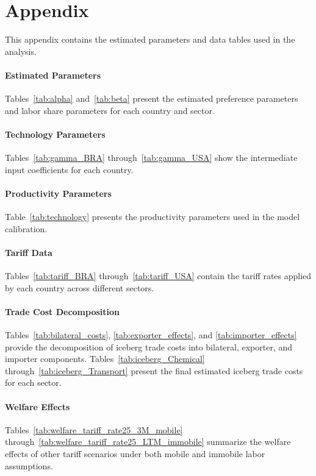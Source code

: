 \section*{Appendix}

This appendix contains the estimated parameters and data tables used in the analysis.

\paragraph{Estimated Parameters}
Tables~\ref{tab:alpha} and~\ref{tab:beta} present the estimated preference parameters and labor share parameters for each country and sector.

\paragraph{Technology Parameters}
Tables~\ref{tab:gamma_BRA} through~\ref{tab:gamma_USA} show the intermediate input coefficients for each country.

\paragraph{Productivity Parameters}
Table~\ref{tab:technology} presents the productivity parameters used in the model calibration.

\paragraph{Tariff Data}
Tables~\ref{tab:tariff_BRA} through~\ref{tab:tariff_USA} contain the tariff rates applied by each country across different sectors.

\paragraph{Trade Cost Decomposition}
Tables~\ref{tab:bilateral_costs}, \ref{tab:exporter_effects}, and \ref{tab:importer_effects} provide the decomposition of iceberg trade costs into bilateral, exporter, and importer components. Tables~\ref{tab:iceberg_Chemical} through~\ref{tab:iceberg_Transport} present the final estimated iceberg trade costs for each sector.

\paragraph{Welfare Effects}
Tables~\ref{tab:welfare_tariff_rate25_3M_mobile} through~\ref{tab:welfare_tariff_rate25_LTM_immobile} summarize the welfare effects of other tariff scenarios under both mobile and immobile labor assumptions.

